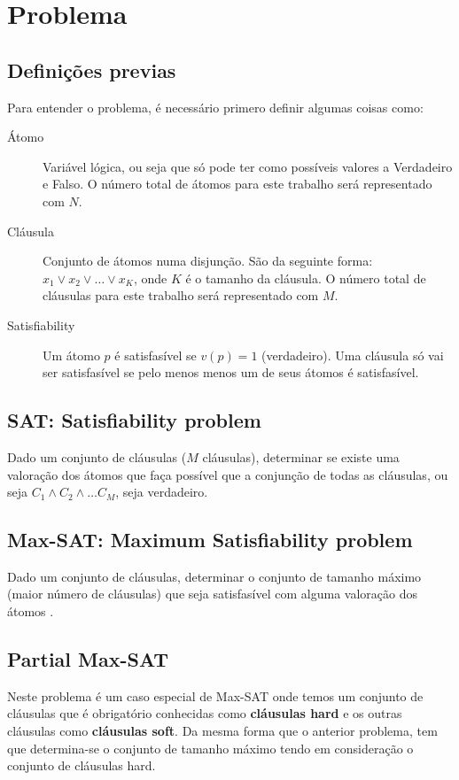 \section{Problema} 

\subsection{Definições previas}
	Para entender o problema, é necessário primero definir algumas coisas como:
	\begin{description}
		\item[Átomo] Variável lógica, ou seja que só pode ter como possíveis valores a Verdadeiro e Falso. O número total de átomos para este trabalho será representado com $N$.
		\item[Cláusula] Conjunto de átomos numa disjunção. São da seguinte forma: $x_1 \lor x_2 \lor \ldots \lor x_K$, onde $K$ é o tamanho da cláusula. O número total de cláusulas para este trabalho será representado com $M$.
		\item[Satisfiability] Um átomo $p$ é satisfasível se $v( p ) = 1$ (verdadeiro). Uma cláusula só vai ser satisfasível se pelo menos menos um de seus átomos é satisfasível.
	\end{description}

\subsection{SAT: Satisfiability problem}
	Dado um conjunto de cláusulas ($M$ cláusulas), determinar se existe uma valoração dos átomos que faça possível que a conjunção de todas as cláusulas, ou seja $C_1 \land C_2 \land \ldots C_M$, seja verdadeiro.

\subsection{Max-SAT: Maximum Satisfiability problem}
	Dado um conjunto de cláusulas, determinar o conjunto de tamanho máximo (maior número de cláusulas) que seja satisfasível com alguma valoração dos átomos \cite{LabIA15}.

\subsection{Partial Max-SAT}
	Neste problema é um caso especial de Max-SAT onde temos um conjunto de cláusulas que é obrigatório conhecidas como \textbf{cláusulas hard} e os outras cláusulas como \textbf{cláusulas soft}. Da mesma forma que o anterior problema, tem que determina-se o conjunto de tamanho máximo tendo em consideração o conjunto de cláusulas hard.

